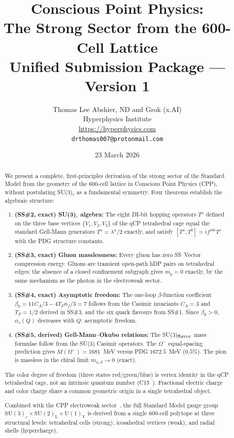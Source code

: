 \documentclass[11pt,a4paper]{article}
\title{\textbf{Conscious Point Physics:\\
The Strong Sector from the 600-Cell Lattice}\\[6pt]
{\large Unified Submission Package --- Version 1}}
\author{Thomas Lee Abshier, ND and Grok (x.AI)\\
Hyperphysics Institute\\
\url{https://hyperphysics.com}\\
\texttt{drthomas007@protonmail.com}}
\date{23 March 2026}
\newcommand{\as}{\alpha_s}
\begin{document}
\maketitle

\begin{abstract}
We present a complete, first-principles derivation of the strong
sector of the Standard Model from the geometry of the 600-cell
lattice in Conscious Point Physics (CPP), without postulating
SU(3)$_c$ as a fundamental symmetry.  Four theorems establish the
algebraic structure:

\begin{enumerate}
\item \textbf{(SS\#2, exact) SU(3)$_c$ algebra:}
The eight DI-bit hopping operators $T^a$ defined on the three base
vertices $\{V_1, V_2, V_3\}$ of the qCP tetrahedral cage equal
the standard Gell-Mann generators $T^a = \lambda^a/2$ exactly, and
satisfy $[T^a, T^b] = if^{abc}T^c$ with the PDG structure constants.

\item \textbf{(SS\#3, exact) Gluon masslessness:}
Every gluon has zero SS~Vector compression energy.  Gluons are
transient open-path hDP pairs on tetrahedral edges; the absence
of a closed confinement subgraph gives $m_g = 0$ exactly, by the
same mechanism as the photon in the electroweak sector.

\item \textbf{(SS\#4, exact) Asymptotic freedom:}
The one-loop $\beta$-function coefficient
$\beta_0 = 11C_A/3 - 4T_F n_f/3 = 7$
follows from the Casimir invariants $C_A = 3$ and $T_F = 1/2$
derived in SS\#3, and the six quark flavours from SS\#1.  Since
$\beta_0 > 0$, $\as(Q)$ decreases with $Q$: asymptotic freedom.

\item \textbf{(SS\#5, derived) Gell-Mann--Okubo relations:}
The SU(3)$_{\rm flavor}$ mass formulae follow from the SU(3)
Casimir operators.  The $\Omega^-$ equal-spacing prediction gives
$M(\Omega^-) = 1681$~MeV versus PDG $1672.5$~MeV ($0.5\%$).
The pion is massless in the chiral limit $m_{u,d} \to 0$ (exact).
\end{enumerate}

The color degree of freedom (three states red/green/blue) is vertex
identity in the qCP tetrahedral cage, not an intrinsic quantum number
(C15~\citep{c15}).  Fractional electric charge and color charge share
a common geometric origin in a single tetrahedral object.

Combined with the CPP electroweak sector~\citep{cpp_ew_unified}, the
full Standard Model gauge group
$\mathrm{SU(3)_c \times SU(2)_L \times U(1)_Y}$
is derived from a single 600-cell polytope at three structural levels:
tetrahedral cells (strong), icosahedral vertices (weak), and radial
shells (hypercharge).
\end{abstract}
\end{document}
